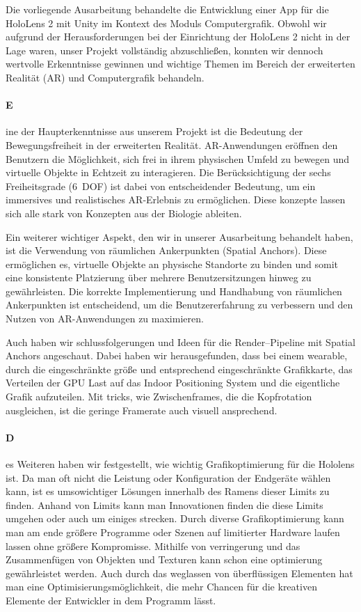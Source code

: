 Die vorliegende Ausarbeitung behandelte die Entwicklung einer App für die HoloLens 2 mit Unity im Kontext des Moduls Computergrafik.
Obwohl wir aufgrund der Herausforderungen bei der Einrichtung der HoloLens 2 nicht in der Lage waren, unser Projekt vollständig abzuschließen, konnten wir dennoch wertvolle Erkenntnisse gewinnen und wichtige Themen im Bereich der erweiterten Realität (AR) und Computergrafik behandeln.

\paragraph{E}ine der Haupterkenntnisse aus unserem Projekt ist die Bedeutung der Bewegungsfreiheit in der erweiterten Realität.
    AR-Anwendungen eröffnen den Benutzern die Möglichkeit, sich frei in ihrem physischen Umfeld zu bewegen und virtuelle Objekte in Echtzeit zu interagieren.
    Die Berücksichtigung der sechs Freiheitsgrade (6~DOF) ist dabei von entscheidender Bedeutung, um ein immersives und realistisches AR-Erlebnis zu ermöglichen.
    Diese konzepte lassen sich alle stark von Konzepten aus der Biologie ableiten.


    Ein weiterer wichtiger Aspekt, den wir in unserer Ausarbeitung behandelt haben, ist die Verwendung von räumlichen Ankerpunkten (Spatial Anchors).
    Diese ermöglichen es, virtuelle Objekte an physische Standorte zu binden und somit eine konsistente Platzierung über mehrere Benutzersitzungen hinweg zu gewährleisten.
    Die korrekte Implementierung und Handhabung von räumlichen Ankerpunkten ist entscheidend, um die Benutzererfahrung zu verbessern und den Nutzen von AR-Anwendungen zu maximieren.

    Auch haben wir schlussfolgerungen und Ideen für die Render--Pipeline mit Spatial Anchors angeschaut.
    Dabei haben wir herausgefunden, dass bei einem wearable, durch die eingeschränkte größe und entsprechend eingeschränkte Grafikkarte, das Verteilen der GPU Last auf das Indoor Positioning System und die eigentliche Grafik aufzuteilen.
    Mit tricks, wie Zwischenframes, die die Kopfrotation ausgleichen, ist die geringe Framerate auch visuell ansprechend.

\paragraph{D}es Weiteren haben wir festgestellt, wie wichtig Grafikoptimierung für die Hololens ist. 
Da man oft nicht die Leistung oder Konfiguration der Endgeräte wählen kann, ist es umsowichtiger Lösungen innerhalb des Ramens dieser Limits zu finden.
Anhand von Limits kann man Innovationen finden die diese Limits umgehen oder auch um einiges strecken.
Durch diverse Grafikoptimierung kann man am ende größere Programme oder Szenen auf limitierter Hardware laufen lassen ohne größere Kompromisse.
Mithilfe von verringerung und das Zusammenfügen von Objekten und Texturen kann schon eine optimierung gewährleistet werden.
Auch durch das weglassen von überflüssigen Elementen hat man eine Optimisierungsmöglichkeit, die mehr Chancen für die kreativen Elemente der Entwickler in dem Programm lässt.

